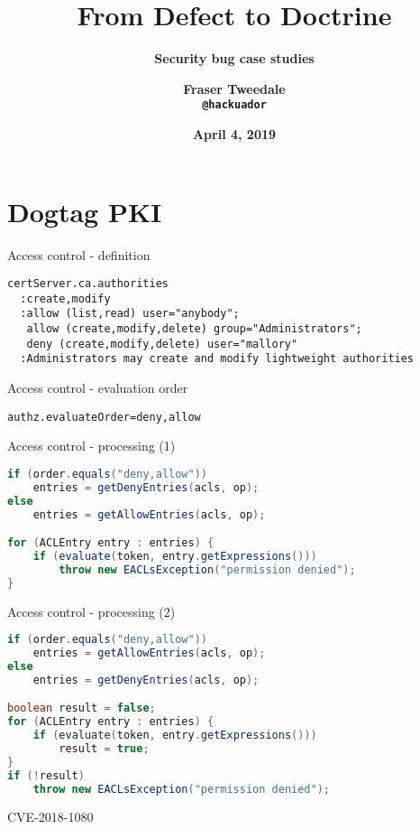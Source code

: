 \documentclass[ignorenonframetext,aspectratio=169,dvipsnames]{beamer}
\title{\bf From Defect to Doctrine}
\subtitle{\bf Security bug case studies}
\author{\bf Fraser Tweedale\\
    \texttt{@hackuador}}
\date{\bf April 4, 2019}
\begin{document}
\begin{frame}
\titlepage
\end{frame}

\section{Dogtag PKI}\label{dogtag}

\begin{frame}[fragile]{Access control - definition}
\large
\begin{verbatim}
certServer.ca.authorities
  :create,modify
  :allow (list,read) user="anybody";
   allow (create,modify,delete) group="Administrators";
   deny (create,modify,delete) user="mallory"
  :Administrators may create and modify lightweight authorities
\end{verbatim}
\end{frame}

\begin{frame}[fragile]{Access control - evaluation order}
\Large
\begin{verbatim}
authz.evaluateOrder=deny,allow
\end{verbatim}
\end{frame}

\begin{frame}[fragile]{Access control - processing (1)}
\begin{lstlisting}[language=Java]
if (order.equals("deny,allow"))
    entries = getDenyEntries(acls, op);
else
    entries = getAllowEntries(acls, op);

for (ACLEntry entry : entries) {
    if (evaluate(token, entry.getExpressions()))
        throw new EACLsException("permission denied");
}
\end{lstlisting}
\end{frame}

\begin{frame}[fragile]{Access control - processing (2)}
\begin{lstlisting}[language=Java]
if (order.equals("deny,allow"))
    entries = getAllowEntries(acls, op);
else
    entries = getDenyEntries(acls, op);

boolean result = false;
for (ACLEntry entry : entries) {
    if (evaluate(token, entry.getExpressions()))
        result = true;
}
if (!result)
    throw new EACLsException("permission denied");
\end{lstlisting}
\end{frame}


\begin{frame}[plain]
\huge
CVE-2018-1080
\end{frame}
\end{document}
